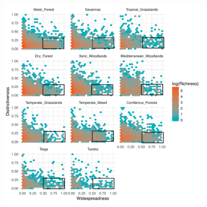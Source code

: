 \documentclass[final]{beamer}
\newlength{\sepwid}
\newlength{\onecolwid}
\newlength{\twocolwid}
\begin{document}
\begin{frame}[t]
\begin{columns}[t]
\begin{column}{\onecolwid}
        \begin{figure}[h]
        \centering
        \includegraphics[width=\textwidth]{./figures/Figure3.pdf}
        \caption{}
        \label{fig:rate_variation}
        \end{figure}





    \end{column}


    \begin{column}{\sepwid}\end{column}			%
\end{columns}
\end{frame}
\end{document}
